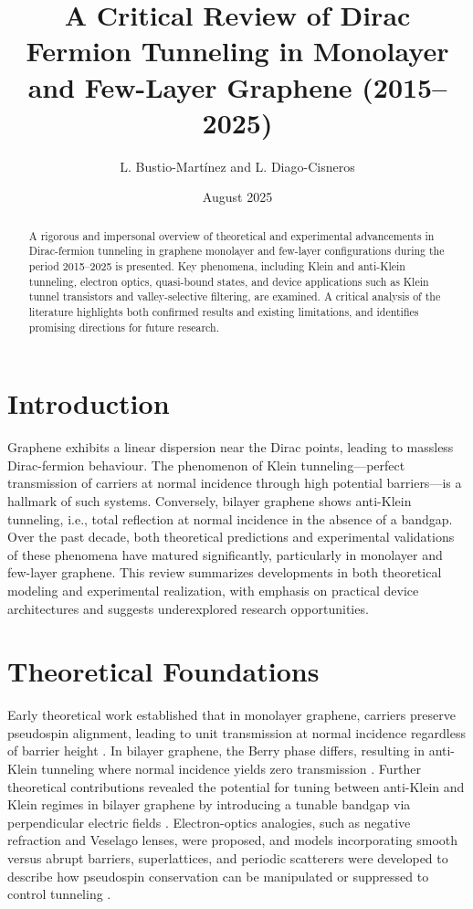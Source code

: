 \documentclass[12pt]{article}
\begin{document}
\title{A Critical Review of Dirac Fermion Tunneling in Monolayer and Few-Layer Graphene (2015–2025)}
\author{L. Bustio-Martínez and L. Diago-Cisneros}
\date{August 2025}
\maketitle

\begin{abstract}
A rigorous and impersonal overview of theoretical and experimental advancements in Dirac-fermion tunneling in graphene monolayer and few-layer configurations during the period 2015–2025 is presented. Key phenomena, including Klein and anti-Klein tunneling, electron optics, quasi-bound states, and device applications such as Klein tunnel transistors and valley-selective filtering, are examined. A critical analysis of the literature highlights both confirmed results and existing limitations, and identifies promising directions for future research.
\end{abstract}

\section{Introduction}
Graphene exhibits a linear dispersion near the Dirac points, leading to massless Dirac-fermion behaviour. The phenomenon of Klein tunneling—perfect transmission of carriers at normal incidence through high potential barriers—is a hallmark of such systems. Conversely, bilayer graphene shows anti-Klein tunneling, i.e., total reflection at normal incidence in the absence of a bandgap. Over the past decade, both theoretical predictions and experimental validations of these phenomena have matured significantly, particularly in monolayer and few-layer graphene. This review summarizes developments in both theoretical modeling and experimental realization, with emphasis on practical device architectures and suggests underexplored research opportunities.

\section{Theoretical Foundations}
Early theoretical work established that in monolayer graphene, carriers preserve pseudospin alignment, leading to unit transmission at normal incidence regardless of barrier height \cite{Chen2016}. In bilayer graphene, the Berry phase differs, resulting in anti-Klein tunneling where normal incidence yields zero transmission \cite{Du2018}. Further theoretical contributions revealed the potential for tuning between anti-Klein and Klein regimes in bilayer graphene by introducing a tunable bandgap via perpendicular electric fields \cite{Du2018}. Electron-optics analogies, such as negative refraction and Veselago lenses, were proposed, and models incorporating smooth versus abrupt barriers, superlattices, and periodic scatterers were developed to describe how pseudospin conservation can be manipulated or suppressed to control tunneling \cite{Walls2015,An2020}.
\end{document}
